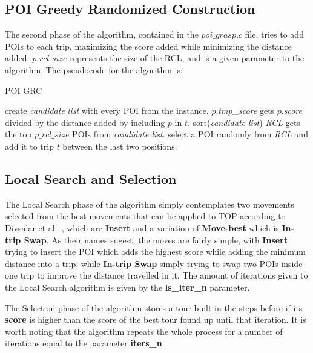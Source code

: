\newpage

\subsection{POI Greedy Randomized Construction}
The second phase of the algorithm, contained in the $poi\_grasp.c$ file, tries to add POIs to each trip, maximizing the score added while minimizing the distance added. $p\_rcl\_size$ represents the size of the RCL, and is a given parameter to the algorithm. The pseudocode for the algorithm is:

\begin{algorithm}
\caption{POI GRC}\label{euclid}
\begin{algorithmic}[1]
\State create \textit{candidate list} with every POI from the instance.
\State $p$.\textit{tmp\_score} gets $p$.\textit{score} divided by the distance added by including $p$ in $t$.
\EndFor
\State sort(\textit{candidate list})
\State \textit{RCL} gets the top $p\_rcl\_size$ POIs from \textit{candidate list}.
\State select a POI randomly from \textit{RCL} and add it to trip $t$ between the last two positions.
\EndWhile
\EndFor
\end{algorithmic}
\end{algorithm}

\subsection{Local Search and Selection}
The Local Search phase of the algorithm simply contemplates two movements selected from the best movements that can be applied to TOP according to Divsalar et al.~\cite{divsalar2013}, which are \textbf{Insert} and a variation of \textbf{Move-best} which is \textbf{In-trip Swap}. As their names sugest, the moves are fairly simple, with \textbf{Insert} trying to insert the POI which adds the highest score while adding the minimum distance into a trip, while \textbf{In-trip Swap} simply trying to swap two POIs inside one trip to improve the distance travelled in it. The amount of iterations given to the Local Search algorithm is given by the \textbf{ls\_iter\_n} parameter.

The Selection phase of the algorithm stores a tour built in the steps before if its \textbf{score} is higher than the score of the best tour found up until that iteration. It is worth noting that the algorithm repeats the whole process for a number of iterations equal to the parameter \textbf{iters\_n}.

